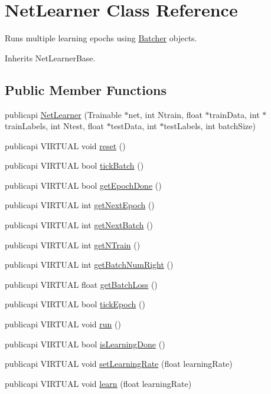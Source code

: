\hypertarget{classNetLearner}{\section{Net\-Learner Class Reference}
\label{classNetLearner}
}


Runs multiple learning epochs using \hyperlink{classBatcher}{Batcher} objects.  




Inherits Net\-Learner\-Base.

\subsection*{Public Member Functions}
\begin{DoxyCompactItemize}
\item 
publicapi \hyperlink{classNetLearner_ae1298aec18f9b90d5631e162e5b1a7bc}{Net\-Learner} (Trainable $\ast$net, int Ntrain, float $\ast$train\-Data, int $\ast$train\-Labels, int Ntest, float $\ast$test\-Data, int $\ast$test\-Labels, int batch\-Size)
\item 
publicapi V\-I\-R\-T\-U\-A\-L void \hyperlink{classNetLearner_aaa130215f22b3da1f9f99de404a96b9b}{reset} ()
\item 
publicapi V\-I\-R\-T\-U\-A\-L bool \hyperlink{classNetLearner_a42be6ba0168298a182a702a96d488535}{tick\-Batch} ()
\item 
publicapi V\-I\-R\-T\-U\-A\-L bool \hyperlink{classNetLearner_a854531128a06cb0c19426db8ced341ba}{get\-Epoch\-Done} ()
\item 
publicapi V\-I\-R\-T\-U\-A\-L int \hyperlink{classNetLearner_a3d2a69f79e1587677ca9f348e51cffac}{get\-Next\-Epoch} ()
\item 
publicapi V\-I\-R\-T\-U\-A\-L int \hyperlink{classNetLearner_a4e3da75a8e6063d22add3cbcbd04345e}{get\-Next\-Batch} ()
\item 
publicapi V\-I\-R\-T\-U\-A\-L int \hyperlink{classNetLearner_a90889134f2ba0bbe863a99f59954f3db}{get\-N\-Train} ()
\item 
publicapi V\-I\-R\-T\-U\-A\-L int \hyperlink{classNetLearner_a8b32e57aad477db1098f787d44c7568d}{get\-Batch\-Num\-Right} ()
\item 
publicapi V\-I\-R\-T\-U\-A\-L float \hyperlink{classNetLearner_a53fd8c5f257e0ff7d08a9b5a6426fdbf}{get\-Batch\-Loss} ()
\item 
publicapi V\-I\-R\-T\-U\-A\-L bool \hyperlink{classNetLearner_a18c3ffeb8f1a3f6dac8019a8343d2c5b}{tick\-Epoch} ()
\item 
publicapi V\-I\-R\-T\-U\-A\-L void \hyperlink{classNetLearner_acb58b6fb2d24de35bf0df9f0b1b37683}{run} ()
\item 
publicapi V\-I\-R\-T\-U\-A\-L bool \hyperlink{classNetLearner_a777ce89028748d1fc22a4f4f3c0bd4a4}{is\-Learning\-Done} ()
\item 
publicapi V\-I\-R\-T\-U\-A\-L void \hyperlink{classNetLearner_a42bc02ddc7da8ca3c19abde1d1055e4c}{set\-Learning\-Rate} (float learning\-Rate)
\item 
publicapi V\-I\-R\-T\-U\-A\-L void \hyperlink{classNetLearner_a189930d926a590e56d6f0a48f8020e1d}{learn} (float learning\-Rate)
\end{DoxyCompactItemize}


